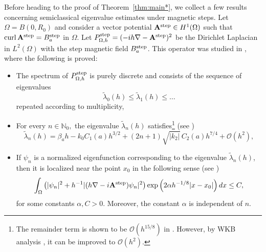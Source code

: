 \documentclass[11pt]{amsart}
\theoremstyle{remark}
\newcommand{\bA}{\mathbf{A}}
\DeclareMathOperator{\Curl}{curl}
\numberwithin{equation}{section}
\begin{document}
Before heading to the proof of Theorem~\ref{thm:main*}, we collect a few results concerning semiclassical eigenvalue estimates under magnetic steps. Let $\Omega=B(0,R_0)$ and consider a vector potential $\bA^{\rm step}\in H^1(\Omega)$ such that $\Curl\bA^{\rm step}=B_a^{\rm step}$ in $\Omega$.  Let $P^{\rm step}_{\Omega,h}=(-ih\nabla-\bA^{\rm step})^2$ be the Dirichlet Laplacian in $L^2(\Omega)$ with the step magnetic field $B_a^{\rm step}$. This operator was studied in \cite{AHK}, where the following is proved:
\begin{itemize}
    \item The spectrum of $P^{\rm step}_{\Omega,h}$ is purely discrete and consists of the sequence of eigenvalues
    \[\tilde\lambda_0(h)\leq\tilde\lambda_1(h)\leq \dots\]
    repeated according to multiplicity,
    \item For every $n\in\mathbb N_0,$ the eigenvalue $\tilde\lambda_n(h)$ satisfies\footnote{The remainder term is shown to be $\mathcal O(h^{15/8})$ in \cite{AHK}. However, by WKB analysis \cite[Theorem~5.1]{FHK},  it can be improved to $\mathcal O(h^{2})$.} (see \cite[Theorem~1.2]{AHK})
    \begin{equation}\label{eq:asymp-ln}
\tilde\lambda_n(h)=\beta_ah-k_0C_1(a)h^{3/2}+(2n+1)\sqrt{|k_2|}\,C_2(a)h^{7/4}+\mathcal O(h^{2}),
    \end{equation}
    \item If $\psi_n$ is a normalized eigenfunction corresponding to the eigenvalue $\tilde\lambda_n(h)$, then it is localized near the point $x_0$ in the following sense (see \cite[Eq. (6.3) and (6.5)]{AHK})
    \begin{equation}\label{eq:dec-ef}
\int_{\Omega} \left( |\psi_{n}|^2 + h^{-1} |(h\nabla - i\bA^{\rm step})\psi_{n}|^2 \right) \exp\left( 2\alpha h^{-1/8} |x-x_0| \right) dx \le C,
    \end{equation}
    for some constants $\alpha,C>0$. Moreover, the constant $\alpha$ is independent of $n$.
\end{itemize}
\end{document}
